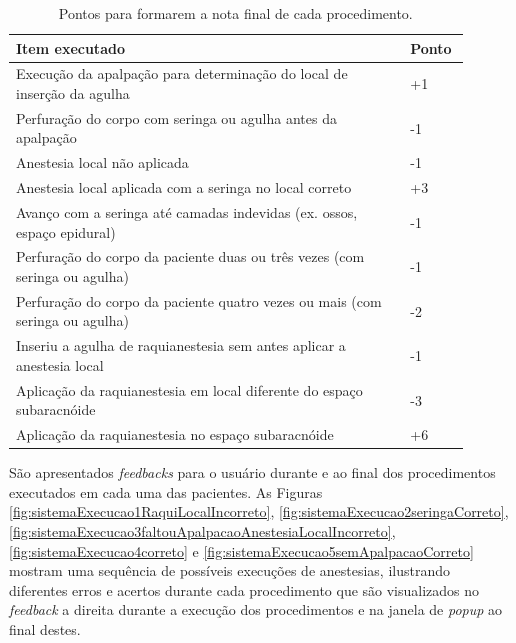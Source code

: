 \begin{table}[!ht]
\begin{center}
\caption{Pontos para formarem a nota final de cada procedimento.}
\label{tab:PontosNotaProcedimento}
\begin{tabular}{|p{0.8\linewidth}|p{0.1\linewidth}|}
\hline
\textbf{Item executado} & \textbf{Ponto}\\
\hline\hline
Execução da apalpação para determinação do local de inserção da agulha & +1\\
Perfuração do corpo com seringa ou agulha antes da apalpação & -1\\
Anestesia local não aplicada & -1\\
Anestesia local aplicada com a seringa no local correto & +3\\
Avanço com a seringa até camadas indevidas (ex. ossos, espaço epidural) & -1\\
Perfuração do corpo da paciente duas ou três vezes (com seringa ou agulha) & -1\\
Perfuração do corpo da paciente quatro vezes ou mais (com seringa ou agulha) & -2\\
Inseriu a agulha de raquianestesia sem antes aplicar a anestesia local & -1\\
Aplicação da raquianestesia em local diferente do espaço subaracnóide & -3\\
Aplicação da raquianestesia no espaço subaracnóide & +6\\
\hline
\end{tabular}
\end{center}
\end{table}

São apresentados \textit{feedbacks} para o usuário durante e ao final dos procedimentos executados em cada uma das pacientes. As Figuras \ref{fig:sistemaExecucao1RaquiLocalIncorreto}, \ref{fig:sistemaExecucao2seringaCorreto}, \ref{fig:sistemaExecucao3faltouApalpacaoAnestesiaLocalIncorreto}, \ref{fig:sistemaExecucao4correto} e \ref{fig:sistemaExecucao5semApalpacaoCorreto} mostram uma sequência de possíveis execuções de anestesias, ilustrando diferentes erros e acertos durante cada procedimento que são visualizados no \textit{feedback} a direita durante a execução dos procedimentos e na janela de \textit{popup} ao final destes. 

